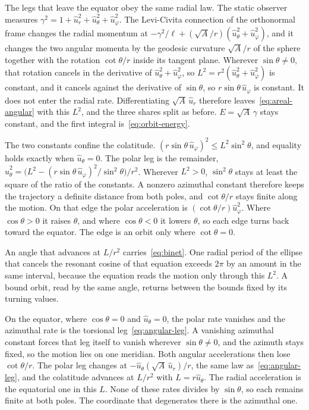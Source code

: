\documentclass[a4paper]{article}
\begin{document}
The legs that leave the equator obey the same radial law. The static observer measures \(\gamma^{2}=1+\hat{u}_{r}^{2}+\hat{u}_{\theta}^{2}+\hat{u}_{\varphi}^{2}\). The Levi-Civita connection of the orthonormal frame changes the radial momentum at \(-\gamma^{2}/\ell+(\sqrt{A}/r)(\hat{u}_{\theta}^{2}+\hat{u}_{\varphi}^{2})\), and it changes the two angular momenta by the geodesic curvature \(\sqrt{A}/r\) of the sphere together with the rotation \(\cot\theta/r\) inside its tangent plane. Wherever \(\sin\theta\neq 0\), that rotation cancels in the derivative of \(\hat{u}_{\theta}^{2}+\hat{u}_{\varphi}^{2}\), so \(L^{2}=r^{2}(\hat{u}_{\theta}^{2}+\hat{u}_{\varphi}^{2})\) is constant, and it cancels against the derivative of \(\sin\theta\), so \(r\sin\theta\,\hat{u}_{\varphi}\) is constant. It does not enter the radial rate. Differentiating \(\sqrt{A}\,\hat{u}_{r}\) therefore leaves~\eqref{eq:areal-angular} with this \(L^{2}\), and the three shares split as before. \(E=\sqrt{A}\,\gamma\) stays constant, and the first integral is~\eqref{eq:orbit-energy}.

The two constants confine the colatitude. \((r\sin\theta\,\hat{u}_{\varphi})^{2}\le L^{2}\sin^{2}\theta\), and equality holds exactly when \(\hat{u}_{\theta}=0\). The polar leg is the remainder, \(\hat{u}_{\theta}^{2}=\bigl(L^{2}-(r\sin\theta\,\hat{u}_{\varphi})^{2}/\sin^{2}\theta\bigr)/r^{2}\). Wherever \(L^{2}>0\), \(\sin^{2}\theta\) stays at least the square of the ratio of the constants. A nonzero azimuthal constant therefore keeps the trajectory a definite distance from both poles, and \(\cot\theta/r\) stays finite along the motion. On that edge the polar acceleration is \((\cot\theta/r)\hat{u}_{\varphi}^{2}\). Where \(\cos\theta>0\) it raises \(\theta\), and where \(\cos\theta<0\) it lowers \(\theta\), so each edge turns back toward the equator. The edge is an orbit only where \(\cot\theta=0\).

An angle that advances at \(L/r^{2}\) carries~\eqref{eq:binet}. One radial period of the ellipse that cancels the resonant cosine of that equation exceeds \(2\pi\) by an amount in the same interval, because the equation reads the motion only through this \(L^{2}\). A bound orbit, read by the same angle, returns between the bounds fixed by its turning values.

On the equator, where \(\cos\theta=0\) and \(\hat{u}_{\theta}=0\), the polar rate vanishes and the azimuthal rate is the torsional leg~\eqref{eq:angular-leg}. A vanishing azimuthal constant forces that leg itself to vanish wherever \(\sin\theta\neq 0\), and the azimuth stays fixed, so the motion lies on one meridian. Both angular accelerations then lose \(\cot\theta/r\). The polar leg changes at \(-\hat{u}_{\theta}(\sqrt{A}\,\hat{u}_{r})/r\), the same law as~\eqref{eq:angular-leg}, and the colatitude advances at \(L/r^{2}\) with \(L=r\hat{u}_{\theta}\). The radial acceleration is the equatorial one in this \(L\). None of these rates divides by \(\sin\theta\), so each remains finite at both poles. The coordinate that degenerates there is the azimuthal one.
\end{document}

